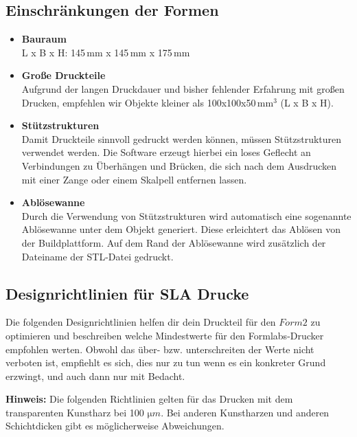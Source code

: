 \documentclass{\basedir/fablab-document}
\begin{document}
	\subsection{Einschränkungen der Formen}
	\begin{itemize}
		\item \textbf{Bauraum}\\L x B x H: 145\,mm x 145\,mm x 175\,mm
		\item \textbf{Große Druckteile}\\Aufgrund der langen Druckdauer und bisher fehlender Erfahrung mit großen Drucken, empfehlen wir Objekte kleiner als 100x100x50\,$\mathrm{mm}^3$ (L x B x H).
		\item \textbf{Stützstrukturen}\\Damit Druckteile sinnvoll gedruckt werden können, müssen Stützstrukturen verwendet werden. Die Software erzeugt hierbei ein loses Geflecht an Verbindungen zu Überhängen und Brücken, die sich nach dem Ausdrucken mit einer Zange oder einem Skalpell entfernen lassen.
		\item \textbf{Ablösewanne}\\Durch die Verwendung von Stützstrukturen wird automatisch eine sogenannte Ablösewanne unter dem Objekt generiert. Diese erleichtert das Ablösen von der Buildplattform. Auf dem Rand der Ablösewanne wird zusätzlich der Dateiname der STL-Datei gedruckt.
	\end{itemize}

\subsection{Designrichtlinien für SLA Drucke}

Die folgenden Designrichtlinien helfen dir dein Druckteil für den $Form2$ zu optimieren und beschreiben welche Mindestwerte für den Formlabs-Drucker empfohlen werten. Obwohl das über- bzw. unterschreiten der Werte nicht verboten ist, empfiehlt es sich, dies nur zu tun wenn es ein konkreter Grund erzwingt, und auch dann nur mit Bedacht.  

\textbf{Hinweis:} Die folgenden Richtlinien gelten für das Drucken mit dem transparenten Kunstharz bei 100 $\mathrm{\mu}m$. Bei anderen Kunstharzen und anderen Schichtdicken gibt es möglicherweise Abweichungen.
\end{document}
